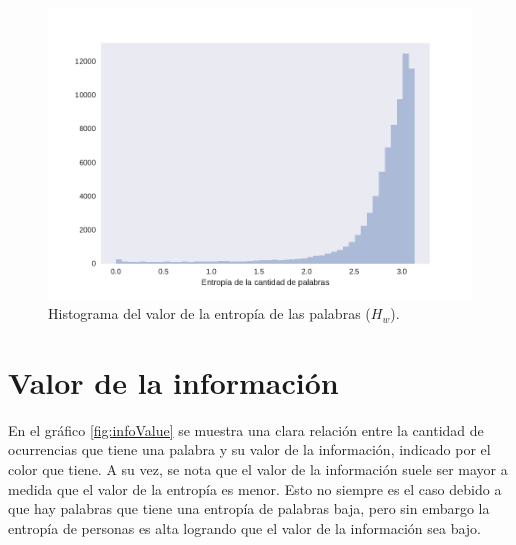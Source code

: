\begin{figure}[ht]
\centering
\includegraphics[width=1.0\textwidth]{./images/DistribucionEntropia.pdf}
\caption{Histograma del valor de la entropía de las palabras ($H_w$).} 
\label{fig:entropiaPalabras} 
\end{figure}



\section{Valor de la información}
\label{sec:ValorDeLaInformacion}
En el gráfico \ref{fig:infoValue} se muestra una clara relación entre la cantidad de ocurrencias que tiene una palabra y su valor de la información, indicado por el color que tiene. A su vez, se nota que el valor de la información suele ser mayor a medida que el valor de la entropía es menor. Esto no siempre es el caso debido a que hay palabras que tiene una entropía de palabras baja, pero sin embargo la entropía de personas es alta logrando que el valor de la información sea bajo.

